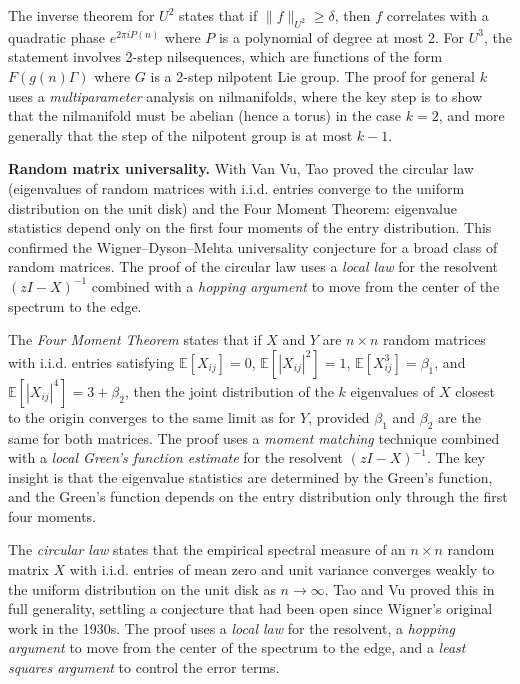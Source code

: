 The inverse theorem for $U^2$ states that if $\|f\|_{U^2} \ge \delta$, then $f$ correlates with a quadratic phase $e^{2\pi i P(n)}$ where $P$ is a polynomial of degree at most 2. For $U^3$, the statement involves 2-step nilsequences, which are functions of the form $F(g(n)\Gamma)$ where $G$ is a 2-step nilpotent Lie group. The proof for general $k$ uses a \emph{multiparameter} analysis on nilmanifolds, where the key step is to show that the nilmanifold must be abelian (hence a torus) in the case $k=2$, and more generally that the step of the nilpotent group is at most $k-1$.

\textbf{Random matrix universality.} With Van Vu, Tao proved the circular law (eigenvalues of random matrices with i.i.d. entries converge to the uniform distribution on the unit disk) and the Four Moment Theorem: eigenvalue statistics depend only on the first four moments of the entry distribution. This confirmed the Wigner--Dyson--Mehta universality conjecture for a broad class of random matrices. The proof of the circular law uses a \emph{local law} for the resolvent $(zI - X)^{-1}$ combined with a \emph{hopping argument} to move from the center of the spectrum to the edge.

The \emph{Four Moment Theorem} states that if $X$ and $Y$ are $n \times n$ random matrices with i.i.d. entries satisfying $\mathbb{E}[X_{ij}] = 0$, $\mathbb{E}[|X_{ij}|^2] = 1$, $\mathbb{E}[X_{ij}^3] = \beta_1$, and $\mathbb{E}[|X_{ij}|^4] = 3 + \beta_2$, then the joint distribution of the $k$ eigenvalues of $X$ closest to the origin converges to the same limit as for $Y$, provided $\beta_1$ and $\beta_2$ are the same for both matrices. The proof uses a \emph{moment matching} technique combined with a \emph{local Green's function estimate} for the resolvent $(zI - X)^{-1}$. The key insight is that the eigenvalue statistics are determined by the Green's function, and the Green's function depends on the entry distribution only through the first four moments.

The \emph{circular law} states that the empirical spectral measure of an $n \times n$ random matrix $X$ with i.i.d. entries of mean zero and unit variance converges weakly to the uniform distribution on the unit disk as $n \to \infty$. Tao and Vu proved this in full generality, settling a conjecture that had been open since Wigner's original work in the 1930s. The proof uses a \emph{local law} for the resolvent, a \emph{hopping argument} to move from the center of the spectrum to the edge, and a \emph{least squares argument} to control the error terms.

